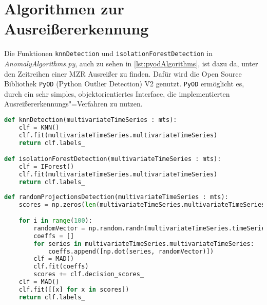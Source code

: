\section{Algorithmen zur Ausreißererkennung}
Die Funktionen \lstinline|knnDetection| und \lstinline|isolationForestDetection| in \textit{AnomalyAlgorithms.py}, auch zu sehen in \autoref{lst:pyodAlgorithms}, ist dazu da, unter den Zeitreihen einer \ac{MZR} Ausreißer zu finden. Dafür wird die Open Source Bibliothek \lstinline|PyOD| (Python Outlier Detection) V2 \cite{zhao2024} genutzt. \lstinline|PyOD| ermöglicht es, durch ein sehr simples, objektorientiertes Interface, die implementierten Ausreißererkennungs"=Verfahren zu nutzen. 
\begin{lstlisting}[caption=Stückweise polynomielle Approximation, label=lst:pyodAlgorithms, style=Python, language=Python]
def knnDetection(multivariateTimeSeries : mts):
    clf = KNN()
    clf.fit(multivariateTimeSeries.multivariateTimeSeries)
    return clf.labels_

def isolationForestDetection(multivariateTimeSeries : mts):
    clf = IForest()
    clf.fit(multivariateTimeSeries.multivariateTimeSeries)
    return clf.labels_
\end{lstlisting}

\begin{lstlisting}[caption=Stückweise polynomielle Approximation, label=lst:randomProjection, style=Python, language=Python]
def randomProjectionsDetection(multivariateTimeSeries : mts):
    scores = np.zeros(len(multivariateTimeSeries.multivariateTimeSeries))

    for i in range(100):
        randomVector = np.random.randn(multivariateTimeSeries.timeSeriesLength)
        coeffs = []
        for series in multivariateTimeSeries.multivariateTimeSeries:
            coeffs.append([np.dot(series, randomVector)])
        clf = MAD()
        clf.fit(coeffs)
        scores += clf.decision_scores_
    clf = MAD()
    clf.fit([[x] for x in scores])
    return clf.labels_
\end{lstlisting}